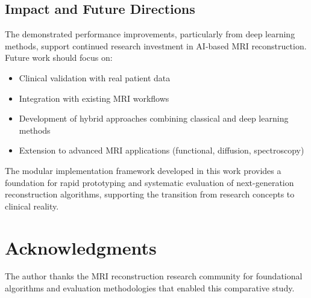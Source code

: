 \documentclass[11pt,a4paper]{article}
\begin{document}
\subsection{Impact and Future Directions}

The demonstrated performance improvements, particularly from deep learning methods, support continued research investment in AI-based MRI reconstruction. Future work should focus on:

\begin{itemize}
    \item Clinical validation with real patient data
    \item Integration with existing MRI workflows
    \item Development of hybrid approaches combining classical and deep learning methods
    \item Extension to advanced MRI applications (functional, diffusion, spectroscopy)
\end{itemize}

The modular implementation framework developed in this work provides a foundation for rapid prototyping and systematic evaluation of next-generation reconstruction algorithms, supporting the transition from research concepts to clinical reality.

\section*{Acknowledgments}

The author thanks the MRI reconstruction research community for foundational algorithms and evaluation methodologies that enabled this comparative study.
\end{document}
